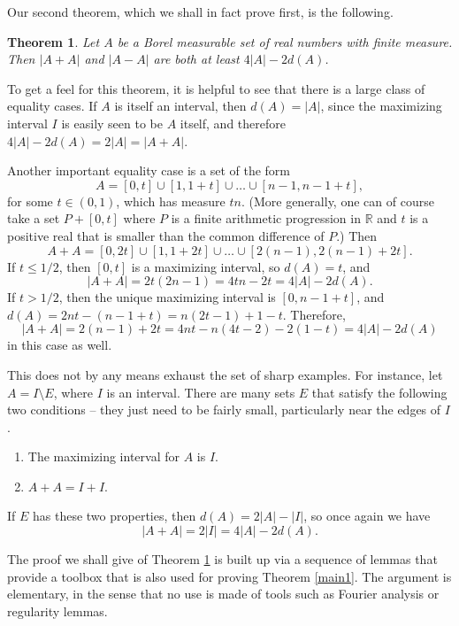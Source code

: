 \documentclass[11pt,reqno]{amsart}
\newtheorem{theorem}{Theorem}[section]
\theoremstyle{definition}
\def\R{\mathbb{R}}
\begin{document}
Our second theorem, which we shall in fact prove first, is the following.

\begin{theorem} \label{main2}
Let $A$ be a Borel measurable set of real numbers with finite measure. Then $|A+A|$ and $|A-A|$ are both at least $4|A|-2d(A)$.
\end{theorem}

To get a feel for this theorem, it is helpful to see that there is a large class of equality cases. If $A$ is itself an interval, then $d(A)=|A|$, since the maximizing interval $I$ is easily seen to be $A$ itself, and therefore $4|A|-2d(A)=2|A|=|A+A|$. 

Another important equality case is a set of the form
\[A=[0,t]\cup[1,1+t]\cup\dots\cup[n-1,n-1+t],\]
for some $t\in(0,1)$, which has measure $tn$. (More generally, one can of course take a set $P+[0,t]$ where $P$ is a finite arithmetic progression in $\R$ and $t$ is a positive real that is smaller than the common difference of $P$.) Then
\[A+A=[0,2t]\cup[1,1+2t]\cup\dots\cup[2(n-1),2(n-1)+2t].\]
If $t\leq 1/2$, then $[0,t]$ is a maximizing interval, so $d(A)=t$, and
\[|A+A|=2t(2n-1)=4tn-2t=4|A|-2d(A).\]
If $t>1/2$, then the unique maximizing interval is $[0,n-1+t]$, and $d(A)=2nt-(n-1+t)=n(2t-1)+1-t$. Therefore,
\[|A+A|=2(n-1)+2t=4nt-n(4t-2)-2(1-t)=4|A|-2d(A)\]
in this case as well.

This does not by any means exhaust the set of sharp examples. For instance, let $A=I\setminus E$, where $I$ is an interval. There are many sets $E$ that satisfy the following two conditions -- they just need to be fairly small, particularly near the edges of $I$. 
\begin{enumerate} 
\item The maximizing interval for $A$ is $I$.
\item $A+A=I+I$.
\end{enumerate}
If $E$ has these two properties, then $d(A)=2|A|-|I|$, so once again we have 
\[|A+A|=2|I|=4|A|-2d(A).\]

The proof we shall give of Theorem \ref{main2} is built up via a sequence of lemmas that provide a toolbox that is also used for proving Theorem \ref{main1}. The argument is elementary, in the sense that no use is made of tools such as Fourier analysis or regularity lemmas. 
\medskip
\end{document}
